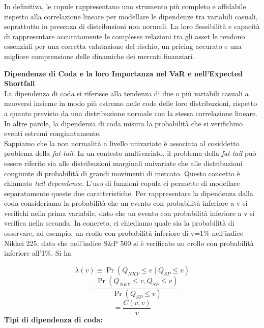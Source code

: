 \documentclass[a4paper,12pt]{article}
\begin{document}
\noindent In definitiva, le copule rappresentano uno strumento più completo e affidabile rispetto alla correlazione lineare per modellare le dipendenze tra variabili casuali, soprattutto in presenza di distribuzioni non normali. La loro flessibilità e capacità di rappresentare accuratamente le complesse relazioni tra gli asset le rendono essenziali per una corretta valutazione del rischio, un pricing accurato e una migliore comprensione delle dinamiche dei mercati finanziari. 
\newline

\noindent \textbf{Dipendenze di Coda e la loro Importanza nel VaR e nell'Expected Shortfall}\\

\noindent La dipendenza di coda si riferisce alla tendenza di due o più variabili casuali a muoversi insieme in modo più estremo nelle code delle loro distribuzioni, rispetto a quanto previsto da una distribuzione normale con la stessa correlazione lineare. In altre parole, la dipendenza di coda misura la probabilità che si verifichino eventi estremi congiuntamente.\\

\noindent Sappiamo che la non normalità a livello univariato è associata al cosiddetto problema della \textit{fat-tail}. In un contesto
multivariato, il problema della \textit{fat-tail} può essere riferito sia alle distribuzioni
marginali univariate che alle distribuzioni congiunte di probabilità di grandi movimenti di mercato. Questo concetto è chiamato \textit{tail dependence}. L'uso di funzioni copula ci permette di modellare separatamente queste due caratteristiche.
Per rappresentare la dipendenza dalla coda consideriamo la probabilità che un evento con
probabilità inferiore a v si verifichi nella prima variabile, dato che un evento con probabilità
inferiore a v si verifica nella seconda. In concreto, ci chiediamo quale sia la probabilità di
osservare, ad esempio, un crollo con probabilità inferiore di v=1\% nell'indice Nikkei 225,
dato che nell'indice S\&P 500 si è verificato un crollo con probabilità inferiore all'1\%. Si ha

\[
\lambda(v) \equiv \Pr(Q_{NKY} \leq v \mid Q_{SP} \leq v)
\]
\[
= \frac{\Pr(Q_{NKY} \leq v, Q_{SP} \leq v)}{\Pr(Q_{SP} \leq v)}
\]
\[
= \frac{C(v,v)}{v}
\]
\newline
\noindent \textbf{Tipi di dipendenza di coda:}\\
\end{document}
